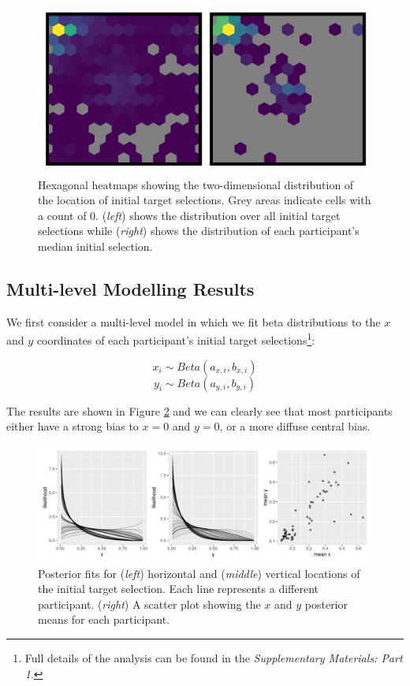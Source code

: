 \documentclass[preprints, article,submit,pdftex,moreauthors]{Definitions/mdpi}
\begin{document}
\begin{figure}[H]
\centering
\includegraphics[width=12 cm]{Figures/init_sel_hex_plot.pdf}
\caption{Hexagonal heatmaps showing the two-dimensional distribution of the location of initial target selections. Grey areas indicate cells with a count of 0. (\textit{left}) shows the distribution over all initial target selections while (\textit{right}) shows the distribution of each participant's median initial selection. }
\label{fig:qjep_init_sel_hex}
\end{figure} 

\subsection{Multi-level Modelling Results}

We first consider a multi-level model in which we fit beta distributions to the $x$ and $y$ coordinates of each participant's initial target selections\footnote{Full details of the analysis can be found in the \textit{Supplementary Materials: Part 1}.}:

\begin{equation}
    x_i \sim Beta(a_{x,i}, b_{x,i})
    \label{eq:beta1x}
\end{equation}
\begin{equation}
    y_i \sim Beta(a_{y,i}, b_{y,i})
    \label{eq:beta1y}
\end{equation}

The results are shown in Figure \ref{fig:qjep_init_sel_mdl} and we can clearly see that most participants either have a strong bias to $x=0$ and $y=0$, or a more diffuse central bias. 

\begin{figure}[H]
\centering
\includegraphics[width=12 cm]{Figures/init_sel_mdl.pdf}
\caption{Posterior fits for (\textit{left}) horizontal and (\textit{middle}) vertical locations of the initial target selection. Each line represents a different participant. (\textit{right}) A scatter plot showing the $x$ and $y$ posterior means for each participant.}
\label{fig:qjep_init_sel_mdl}
\end{figure} 
\end{document}
